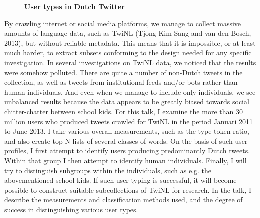 \documentclass[10pt, a4paper, twopage, headinclude, footinclude, BCOR5mm]{book}
\begin{document}
\newpage

\begin{figure}[t!]
\centering
\large\textbf{User types in Dutch Twitter}
\vspace*{0.5cm}
\end{figure}


\begin{table}[t!]
\end{table} 
\noindent
By crawling internet or social media platforms, we manage to collect massive amounts of language data, such as TwiNL (Tjong Kim Sang and van den Bosch, 2013), but without reliable metadata. This means that it is impossible, or at least much harder, to extract subsets conforming to the design needed for any specific investigation. In several investigations on TwiNL data, we noticed that the results were somehow polluted. There are quite a number of non-Dutch tweets in the collection, as well as tweets from institutional feeds and/or bots rather than human individuals. And even when we manage to include only individuals, we see unbalanced results because the data appears to be greatly biased towards social chitter-chatter between school kids.  For this talk, I examine the more than 30 million users who produced tweets crawled for TwiNL in the period Januari 2011 to June 2013. I take various overall measurements, such as the type-token-ratio, and also create top-N lists of several classes of words. On the basis of such user profiles, I first attempt to identify users producing predominantly Dutch tweets. Within that group I then attempt to identify human individuals. Finally, I will try to distinguish subgroups within the individuals, such as e.g. the abovementioned school kids. If such user typing is successful, it will become possible to construct suitable subcollections of TwiNL for research.   In the talk, I describe the measurements and classification methods used, and the degree of success in distinguishing various user types.   
\end{document}
